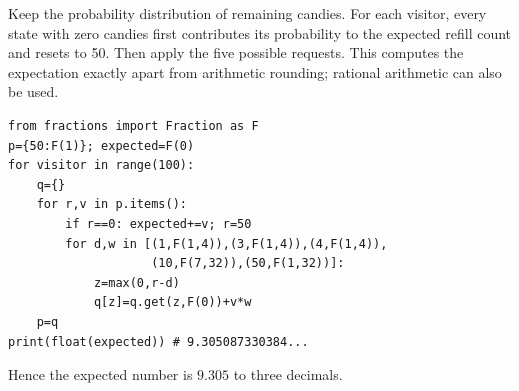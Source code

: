 Keep the probability distribution of remaining candies. For each visitor, every state with zero candies first contributes its probability to the expected refill count and resets to 50. Then apply the five possible requests. This computes the expectation exactly apart from arithmetic rounding; rational arithmetic can also be used.\begin{verbatim}
from fractions import Fraction as F
p={50:F(1)}; expected=F(0)
for visitor in range(100):
    q={}
    for r,v in p.items():
        if r==0: expected+=v; r=50
        for d,w in [(1,F(1,4)),(3,F(1,4)),(4,F(1,4)),
                    (10,F(7,32)),(50,F(1,32))]:
            z=max(0,r-d)
            q[z]=q.get(z,F(0))+v*w
    p=q
print(float(expected)) # 9.305087330384...
\end{verbatim}
Hence the expected number is $\boxed{9.305}$ to three decimals.
